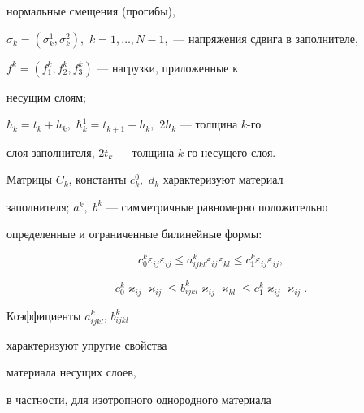 нормальные смещения (прогибы),


$ \sigma _{k} = (\sigma _{k}^1, \sigma _{k}^2),$ $k = 1, \dotsc


, N - 1,$ --- напряжения сдвига в заполнителе,


 $f^{k} = (f^{k}_{1}, f^{k}_{2}, f^{k}_{3})$ --- нагрузки, приложенные к 


несущим слоям; 


$\hbar_{k} = t_{k} + h_{k},$ $\hbar ^{1}_{k} = 


t_{k+1} + h_{k},$ $2h_{k} $ --- толщина $k$-го


слоя заполнителя, $2t_{k}$ --- толщина $k$-го несущего слоя. 


Матрицы $C_k$, константы $c^0_k,$ $d_k$ характеризуют материал 


заполнителя; $a^{k},$ $b^{k}$ --- симметричные равномерно положительно 


определенные и ограниченные билинейные формы:


\begin{equation}\label{ell1}


c^k_{0} \varepsilon _{ij} \varepsilon _{ij} 


\le a^{k}_{ijkl} \varepsilon _{ij} \varepsilon _{kl} 


\le c^{k}_{1} \varepsilon _{ij} 


\varepsilon _{ij},


\end{equation}


\begin{equation}\label{ell2}


c^{k}_{0} \varkappa _{ij} 


\varkappa _{ij} \le b^{k}_{ijkl} 


\varkappa _{ij} \varkappa_{kl}


\le c^{k}_{1} \varkappa _{ij} 


\varkappa _{ij}.


\end{equation}


Коэффициенты $a^{k}_{ijkl}$, $b^{k}_{ijkl}$ 


характеризуют упругие свойства


материала несущих слоев,


в частности, для изотропного однородного материала



